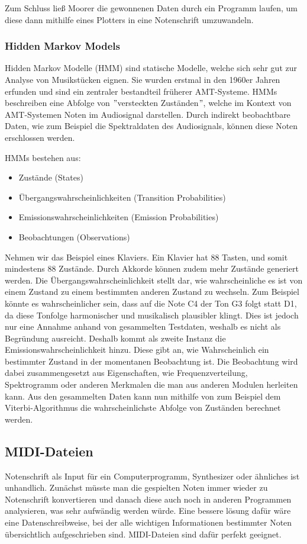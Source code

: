 Zum Schluss ließ Moorer die gewonnenen Daten durch ein Programm laufen, 
um diese dann mithilfe eines Plotters in eine Notenschrift umzuwandeln.

\subsubsection{Hidden Markov Models}
Hidden Markov Modelle (HMM) sind statische Modelle, welche sich sehr gut zur Analyse von Musikstücken eignen.
Sie wurden erstmal in den 1960er Jahren erfunden
\cite{baum1970maximization}
und sind ein zentraler bestandteil früherer AMT-Systeme.
HMMs beschreiben eine Abfolge von \("\)versteckten Zuständen\("\),
welche im Kontext von AMT-Systemen Noten im Audiosignal darstellen.
Durch indirekt beobachtbare Daten, wie zum Beispiel die Spektraldaten des Audiosignals,
können diese Noten erschlossen werden.

HMMs bestehen aus:
\begin{itemize}
    \item Zustände (States)
    \item Übergangswahrscheinlichkeiten (Transition Probabilities)
    \item Emissionswahrscheinlichkeiten (Emission Probabilities)
    \item Beobachtungen (Observations)
\end{itemize}
Nehmen wir das Beispiel eines Klaviers.
Ein Klavier hat 88 Tasten, und somit mindestens 88 Zustände.
Durch Akkorde können zudem mehr Zustände generiert werden.
Die Übergangswahrscheinlichkeit stellt dar,
wie wahrscheinliche es ist von einem Zustand zu einem bestimmten anderen Zustand zu wechseln.
Zum Beispiel könnte es wahrscheinlicher sein, dass auf die Note C4 der Ton G3 folgt statt D1,
da diese Tonfolge harmonischer und musikalisch plausibler klingt.
Dies ist jedoch nur eine Annahme anhand von gesammelten Testdaten, weshalb es nicht als Begründung ausreicht.
Deshalb kommt als zweite Instanz die Emissionswahrscheinlichkeit hinzu.
Diese gibt an, wie Wahrscheinlich ein bestimmter Zustand in der momentanen Beobachtung ist.
Die Beobachtung wird dabei zusammengesetzt aus Eigenschaften, wie Frequenzverteilung, Spektrogramm
oder anderen Merkmalen die man aus anderen Modulen herleiten kann.
Aus den gesammelten Daten kann nun mithilfe von zum Beispiel dem Viterbi-Algorithmus
die wahrscheinlichste Abfolge von Zuständen berechnet werden.

\subsection{MIDI-Dateien}
Notenschrift als Input für ein Computerprogramm, Synthesizer oder ähnliches ist unhandlich.
Zunächst müsste man die gespielten Noten immer wieder zu Notenschrift konvertieren
und danach diese auch noch in anderen Programmen analysieren, was sehr aufwändig werden würde.
Eine bessere lösung dafür wäre eine Datenschreibweise,
bei der alle wichtigen Informationen bestimmter Noten übersichtlich aufgeschrieben sind.
MIDI-Dateien sind dafür perfekt geeignet.

